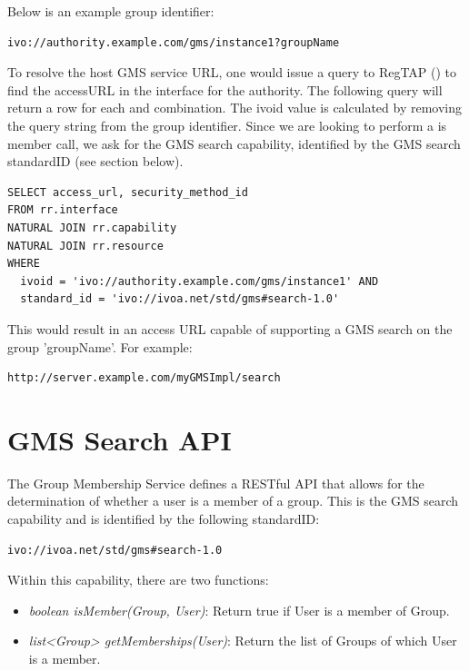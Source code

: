 \documentclass[11pt,a4paper]{ivoa}
\begin{document}
Below is an example group identifier:

\begin{verbatim}
ivo://authority.example.com/gms/instance1?groupName
\end{verbatim}

To resolve the host GMS service URL, one would issue a query to RegTAP (\citep{std:RegTAP}) to find the accessURL in the interface for the authority.  The following query will return a row for each  and  combination.  The ivoid value is calculated by removing the query string from the group identifier.  Since we are looking to perform a is member call, we ask for the GMS search capability, identified by the GMS search standardID (see section below).

\begin{verbatim}
SELECT access_url, security_method_id
FROM rr.interface
NATURAL JOIN rr.capability
NATURAL JOIN rr.resource
WHERE
  ivoid = 'ivo://authority.example.com/gms/instance1' AND
  standard_id = 'ivo://ivoa.net/std/gms#search-1.0'
\end{verbatim}

This would result in an access URL capable of supporting a GMS search on the group 'groupName'.  For example:

\begin{verbatim}
http://server.example.com/myGMSImpl/search
\end{verbatim}

\section{GMS Search API}

The Group Membership Service defines a RESTful API \citep{fielding00} that allows for the determination of whether a user is a member of a group.  This is the GMS search capability and is identified by the following standardID:

\begin{verbatim}
ivo://ivoa.net/std/gms#search-1.0
\end{verbatim}

Within this capability, there are two functions:

\begin{itemize}
\item \emph{boolean isMember(Group, User)}: Return true if User is a member of Group.
\item \emph{list<Group> getMemberships(User)}: Return the list of Groups of which User is a member.
\end{itemize}
\end{document}
